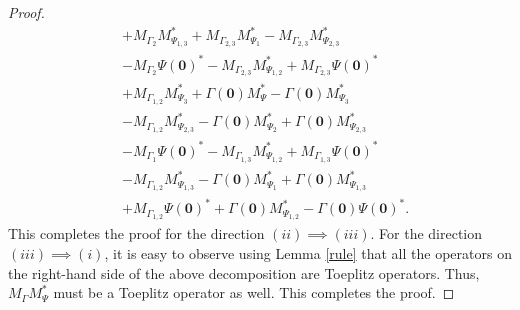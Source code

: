 \documentclass[10pt,a4paper]{amsart}
\begin{document}
\begin{proof}
\begin{align*}
&+ M_{\Gamma_2} M_{\Psi_{1,3}}^* + M_{\Gamma_{2,3}} M_{\Psi_{1}}^* - M_{\Gamma_{2,3}}  M_{\Psi_{2,3}}^*\\
&-M_{\Gamma_2} \Psi(\bm{0})^* - M_{\Gamma_{2,3}} M_{\Psi_{1,2}}^* + M_{\Gamma_{2,3}}  \Psi(\bm{0})^*\\
&+M_{\Gamma_{1,2}} M_{\Psi_3}^* + \Gamma(\bm{0}) M_{\Psi}^* - \Gamma(\bm{0}) M_{\Psi_3}^*\\
&-M_{\Gamma_{1,2}} M_{\Psi_{2,3}}^*  - \Gamma(\bm{0}) M_{\Psi_{2}}^* +  \Gamma(\bm{0}) M_{\Psi_{2,3}}^*\\
&-M_{\Gamma_{1}} \Psi(\bm{0})^*  - M_{\Gamma_{1,3}} M_{\Psi_{1,2}}^* +  M_{\Gamma_{1,3}} \Psi(\bm{0})^* \\
&-M_{\Gamma_{1,2}} M_{\Psi_{1,3}}^*  - \Gamma(\bm{0}) M_{\Psi_{1}}^* +  \Gamma(\bm{0}) M_{\Psi_{1,3}}^* \\
&+M_{\Gamma_{1,2}} \Psi(\bm{0})^*  + \Gamma(\bm{0}) M_{\Psi_{1,2}}^* -  \Gamma(\bm{0}) \Psi(\bm{0})^*.
\end{align*}
This completes the proof for the direction $(ii) \implies (iii)$. For the direction $(iii) \implies (i)$, it is easy to observe using Lemma \ref{rule} that all the operators on the right-hand side of the above decomposition are Toeplitz operators. Thus, $M_{\Gamma}M_{\Psi}^*$ must be a Toeplitz operator as well.
This completes the proof.
\end{proof}
\end{document}
